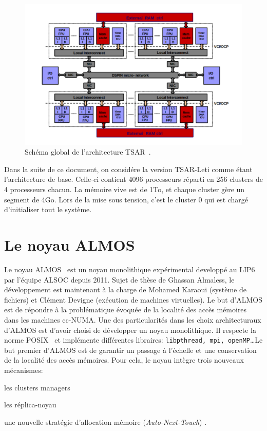     \begin{figure}[ht]
      \centering \includegraphics[scale=0.2]{include/img/tsar.png}
      \caption{Schéma global de l'architecture TSAR~\citep{greiner2009tsar}.}
      \label{fig:tsar}
    \end{figure}

    Dans la suite de ce document, on considére la version TSAR-Leti comme étant
    l'architecture de base. Celle-ci contient 4096 processeurs réparti en 256
    clusters de 4 processeurs chacun. La mémoire vive est de 1To, et chaque
    cluster gère un segment de 4Go. Lors de la mise sous tension, c'est le
    cluster 0 qui est chargé d'initialiser tout le système.

  \section{Le noyau ALMOS}
  \label{sec:almos}

    Le noyau ALMOS~\cite{almaless2011almos} est un noyau monolithique
    expérimental developpé au LIP6 par l'équipe ALSOC depuis 2011. Sujet de
    thèse de Ghassan Almaless, le développement est maintenant à la charge de
    Mohamed Karaoui (système de fichiers) et Clément Devigne (exécution de
    machines virtuelles). Le but d'ALMOS est de répondre à la problématique
    évoquée de la localité des accès mémoires dans les machines cc-NUMA. Une des
    particularités dans les choix architecturaux d'ALMOS est d'avoir choisi de
    développer un noyau monolithique. Il respecte la norme
    POSIX~\cite{posix2013} et implémente différentes libraires:
    \texttt{libpthread, mpi, openMP}\ldots Le but premier d'ALMOS est de
    garantir un passage à l'échelle et une conservation de la localité des accès
    mémoires. Pour cela, le noyau intègre trois nouveaux mécanismes:
    \benumline \item les clusters managers \item les réplica-noyau \item une
    nouvelle stratégie d'allocation mémoire (\textit{Auto-Next-Touch})
    \eenumline.

